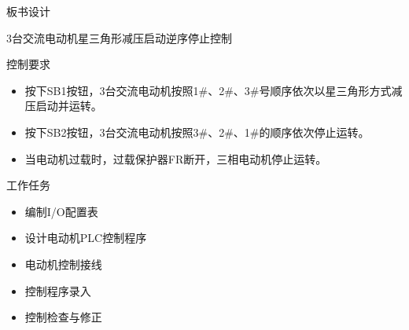 {\begin{landscape}
\end{landscape}
\clearpage

\begin{center}
{\huge 板书设计}
\end{center}
}

\begin{frame}[containsverbatim]{3台交流电动机星三角形减压启动逆序停止控制}
\begin{block}{控制要求}
\begin{itemize}
\item 按下SB1按钮，3台交流电动机按照1\#、2\#、3\#号顺序依次以星三角形方式减压启动并运转。
\item 按下SB2按钮，3台交流电动机按照3\#、2\#、1\#的顺序依次停止运转。
\item 当电动机过载时，过载保护器FR断开，三相电动机停止运转。
\end{itemize}
\end{block}
\end{frame}
\begin{frame}{}
\begin{block}{工作任务}
\begin{itemize}
\item 编制I/O配置表
\item 设计电动机PLC控制程序
\item 电动机控制接线
\item 控制程序录入
\item 控制检查与修正
\end{itemize}
\end{block}
\end{frame}
